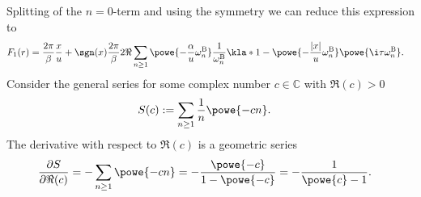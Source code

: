 \documentclass[english, parskip=full]{scrartcl}
\newcommand{\B}{\text{B}}
\newcommand{\TODO}[1]{\color{red!60!black} #1\color{black}}
\begin{document}
Splitting of the $n=0$-term and using the symmetry we can reduce this expression to
\begin{align}
F_1(r) &= \frac{2\pi}{\beta} \frac{x}{u} + \sgn(x) \frac{2\pi}{\beta} 2\Re \sum_{n\ge 1} \powe{-\frac{\alpha}{u} \omega_n^\B} \frac{1}{\omega_n^\B} \kla*{1 - \powe{-\frac{|x|}{u} \omega_n^\B} \powe{\i \tau \omega_n^\B}}.
\end{align}
Consider the general series for some complex number $c\in\mathbb{C}$ with $\Re(c) > 0$
\begin{align}
S(c) &:= \sum_{n\ge 1} \frac{1}{n} \powe{-cn}.
\end{align}
The derivative with respect to $\Re(c)$ is a geometric series
\begin{align}
\frac{\partial S}{\partial \Re(c)} &= -\sum_{n\ge 1} \powe{-cn} = -\frac{\powe{-c}}{1 - \powe{-c}} = -\frac{1}{\powe{c} - 1}.
\end{align}
\end{document}
